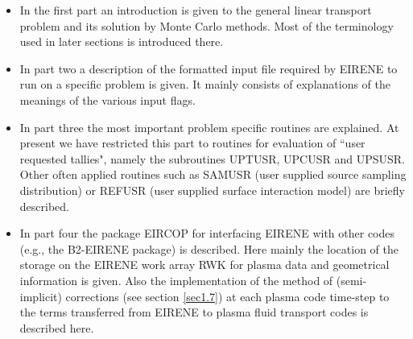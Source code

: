 \begin{itemize}
\item
In the first part an introduction is given to the
general linear transport problem and its solution by Monte Carlo methods.
Most of the terminology used in later sections is introduced there.\\
\item
In part two a description of the formatted input file required by
EIRENE to run on a specific problem is given. It mainly consists of
explanations of the meanings of the various input flags.\\
\item In part three the most important problem specific routines
are explained. At present we have restricted this part to routines
for evaluation of ``user requested tallies", namely the
subroutines UPTUSR, UPCUSR and UPSUSR. Other often applied
routines such as SAMUSR (user supplied source sampling
distribution) or REFUSR (user supplied surface
interaction model) are briefly described.\\
\item
In part four
the package EIRCOP for
interfacing
EIRENE with other codes (e.g., the B2-EIRENE package) is
described. Here mainly the location of the storage on
the EIRENE work array RWK for plasma data and geometrical information
is given. Also the implementation of the method of (semi-implicit)
corrections (see section \ref{sec1.7}) at each plasma code time-step to
the terms
transferred from EIRENE to plasma fluid transport codes is described
here. \\
\end{itemize}
